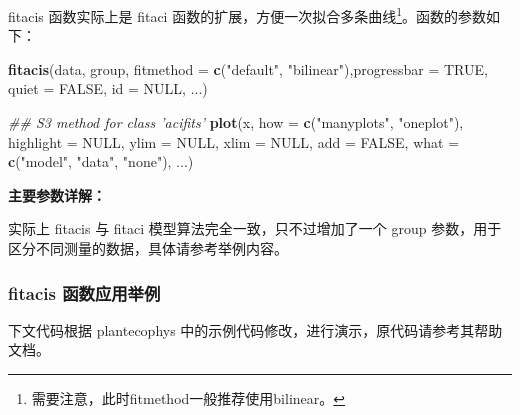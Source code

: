 \documentclass[
]{krantz}
\makeatletter
\newenvironment{Shaded}{\begin{snugshade}}{\end{snugshade}}
\newcommand{\CommentTok}[1]{\textcolor[rgb]{0.56,0.35,0.01}{\textit{#1}}}
\newcommand{\DataTypeTok}[1]{\textcolor[rgb]{0.13,0.29,0.53}{#1}}
\newcommand{\DecValTok}[1]{\textcolor[rgb]{0.00,0.00,0.81}{#1}}
\newcommand{\KeywordTok}[1]{\textcolor[rgb]{0.13,0.29,0.53}{\textbf{#1}}}
\newcommand{\NormalTok}[1]{#1}
\newcommand{\OperatorTok}[1]{\textcolor[rgb]{0.81,0.36,0.00}{\textbf{#1}}}
\newcommand{\OtherTok}[1]{\textcolor[rgb]{0.56,0.35,0.01}{#1}}
\newcommand{\StringTok}[1]{\textcolor[rgb]{0.31,0.60,0.02}{#1}}
\newenvironment{kframe}{%
\medskip{}
\setlength{\fboxsep}{.8em}
 \def\at@end@of@kframe{}%
 \ifinner\ifhmode%
  \def\at@end@of@kframe{\end{minipage}}%
  \begin{minipage}{\columnwidth}%
 \fi\fi%
 \def\FrameCommand##1{\hskip\@totalleftmargin \hskip-\fboxsep
 \colorbox{shadecolor}{##1}\hskip-\fboxsep
     \hskip-\linewidth \hskip-\@totalleftmargin \hskip\columnwidth}%
 \MakeFramed {\advance\hsize-\width
   \@totalleftmargin\z@ \linewidth\hsize
   \@setminipage}}%
 {\par\unskip\endMakeFramed%
 \at@end@of@kframe}
\renewenvironment{Shaded}{\begin{kframe}}{\end{kframe}}
\makeatother
\begin{document}
fitacis 函数实际上是 fitaci 函数的扩展，方便一次拟合多条曲线\footnote{需要注意，此时fitmethod一般推荐使用bilinear。}。函数的参数如下：

\begin{Shaded}
\begin{Highlighting}[]
\KeywordTok{fitacis}\NormalTok{(data, group, }\DataTypeTok{fitmethod =} \KeywordTok{c}\NormalTok{(}\StringTok{"default"}\NormalTok{, }
        \StringTok{"bilinear"}\NormalTok{),}\DataTypeTok{progressbar =} \OtherTok{TRUE}\NormalTok{, }
        \DataTypeTok{quiet =} \OtherTok{FALSE}\NormalTok{, }\DataTypeTok{id =} \OtherTok{NULL}\NormalTok{, ...)}

\CommentTok{## S3 method for class 'acifits'}
\KeywordTok{plot}\NormalTok{(x, }\DataTypeTok{how =} \KeywordTok{c}\NormalTok{(}\StringTok{"manyplots"}\NormalTok{, }\StringTok{"oneplot"}\NormalTok{), }
     \DataTypeTok{highlight =} \OtherTok{NULL}\NormalTok{, }\DataTypeTok{ylim =} \OtherTok{NULL}\NormalTok{, }
     \DataTypeTok{xlim =} \OtherTok{NULL}\NormalTok{, }\DataTypeTok{add =} \OtherTok{FALSE}\NormalTok{, }\DataTypeTok{what =} \KeywordTok{c}\NormalTok{(}\StringTok{"model"}\NormalTok{,}
     \StringTok{"data"}\NormalTok{, }\StringTok{"none"}\NormalTok{), ...)}
\end{Highlighting}
\end{Shaded}

\textbf{主要参数详解：}

实际上 fitacis 与 fitaci 模型算法完全一致，只不过增加了一个 group 参数，用于区分不同测量的数据，具体请参考举例内容。

\hypertarget{fitacis_exa}{%
\subsubsection{fitacis 函数应用举例}\label{fitacis_exa}}

下文代码根据 plantecophys 中的示例代码修改，进行演示，原代码请参考其帮助文档。

\begin{Shaded}
\end{Shaded}
\end{document}
